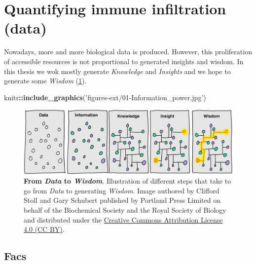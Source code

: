 \documentclass[12pt,]{book}
\newenvironment{Shaded}{\begin{snugshade}}{\end{snugshade}}
\newcommand{\KeywordTok}[1]{\textcolor[rgb]{0.13,0.29,0.53}{\textbf{#1}}}
\newcommand{\StringTok}[1]{\textcolor[rgb]{0.31,0.60,0.02}{#1}}
\newcommand{\OperatorTok}[1]{\textcolor[rgb]{0.81,0.36,0.00}{\textbf{#1}}}
\newcommand{\NormalTok}[1]{#1}
\theoremstyle{definition}
\theoremstyle{definition}
\theoremstyle{definition}
\theoremstyle{remark}
\begin{document}
\hypertarget{quantifying-immune-infiltration-data}{%
\section{Quantifying immune infiltration
(data)}\label{quantifying-immune-infiltration-data}}

Nowadays, more and more biological data is produced. However, this
proliferation of accessible resources is not proportional to generated
insights and wisdom. In this thesis we wok mostly generate
\emph{Knowledge} and \emph{Insights} and we hope to generate some
\emph{Wisdom} (\ref{fig:information-power}).

\begin{Shaded}
\begin{Highlighting}[]
\NormalTok{knitr}\OperatorTok{::}\KeywordTok{include_graphics}\NormalTok{(}\StringTok{'figures-ext/01-Information_power.jpg'}\NormalTok{)}
\end{Highlighting}
\end{Shaded}

\begin{figure}

{\centering \includegraphics[width=0.8\linewidth]{figures-ext/01-Information_power} 

}

\caption{\textbf{From \emph{Data} to
\emph{Wisdom}}. Illustration of different steps that take to go from
\emph{Data} to generating \emph{Wisdom}. Image authored by Clifford
Stoll and Gary Schubert published by Portland Press Limited on behalf of
the Biochemical Society and the Royal Society of Biology and distributed
under the \href{https://creativecommons.org/licenses/by/4.0/}{Creative
Commons Attribution License 4.0 (CC BY)}.}\label{fig:information-power}
\end{figure}









\hypertarget{facs}{%
\subsection{Facs}\label{facs}}
\end{document}
